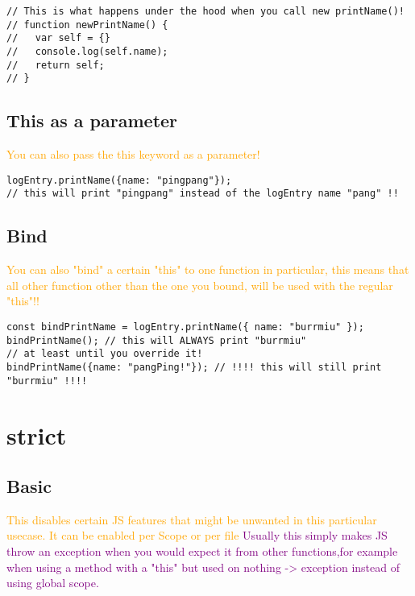 \documentclass[main.tex,fontsize=6pt,paper=a4,paper=landscape,DIV=calc,]{scrartcl}
\begin{document}
\begin{multicols*}{4}
\begin{lstlisting}
// This is what happens under the hood when you call new printName()!
// function newPrintName() {
//   var self = {}
//   console.log(self.name);
//   return self;
// }
\end{lstlisting}
\vspace{2mm}

\subsection{This as a parameter}  
\textcolor{orange}{You can also pass the this keyword as a parameter!}\newline
\vspace{-2mm}
\begin{lstlisting}
logEntry.printName({name: "pingpang"});
// this will print "pingpang" instead of the logEntry name "pang" !!
\end{lstlisting}
\vspace{2mm}

\subsection{Bind}  
\textcolor{orange}{You can also "bind" a certain "this" to one function in particular, this means that all other function other than the one you bound, will be used with the regular "this"!!}\newline
\vspace{-2mm}
\begin{lstlisting}
const bindPrintName = logEntry.printName({ name: "burrmiu" });
bindPrintName(); // this will ALWAYS print "burrmiu"
// at least until you override it!
bindPrintName({name: "pangPing!"}); // !!!! this will still print "burrmiu" !!!!
\end{lstlisting}
\vspace{2mm}


\section{strict}


\subsection{Basic} 
\textcolor{orange}{This disables certain JS features that might be unwanted in this particular usecase. \newline
It can be enabled per Scope or per file}\newline
\textcolor{purple}{Usually this simply makes JS throw an exception when you would expect it from other functions,for example when using a method with a "this" but used on nothing -> exception instead of using global scope.}


\end{multicols*}
\end{document}
